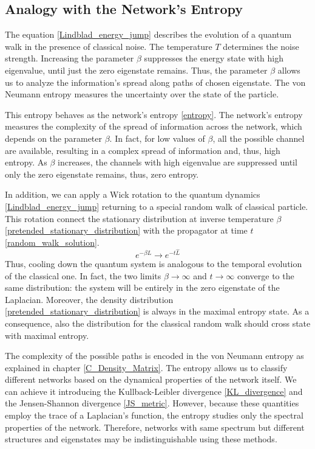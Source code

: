\subsection{Analogy with the Network's Entropy}

The equation \eqref{Lindblad_energy_jump} describes the evolution of a quantum walk in the presence of classical noise. The temperature $T$ determines the noise strength.
Increasing the parameter $\beta$ suppresses the energy state with high eigenvalue, until just the zero eigenstate remains. Thus, the parameter $\beta$ allows us to analyze the information's spread along paths of chosen eigenstate. The von Neumann entropy measures the uncertainty over the state of the particle. 

This entropy behaves as the network's entropy \eqref{entropy}. 
The network's entropy measures the complexity of the spread of information across the network, which depends on the parameter $\beta$. 
In fact, for low values of $\beta$, all the possible channel are available, resulting in a complex spread of information and, thus, high entropy. As $\beta$ increases, the channels with high eigenvalue are suppressed until only the zero eigenstate remains, thus, zero entropy. 

In addition, we can apply a Wick rotation to the quantum dynamics \eqref{Lindblad_energy_jump} returning to a special random walk of classical particle. This rotation connect the stationary distribution at inverse temperature $\beta$ \eqref{pretended_stationary_distribution} with the propagator at time $t$ \eqref{random_walk_solution}.
\begin{equation}
e^{-\beta\hat L} \rightarrow e^{-t\hat L}
\end{equation}
Thus, cooling down the quantum system is analogous to the temporal evolution of the classical one. In fact, the two limits $\beta \rightarrow \infty$ and $t \rightarrow \infty$ converge to the same distribution: the system will be entirely in the zero eigenstate of the Laplacian.
Moreover, the density distribution \eqref{pretended_stationary_distribution} is always in the maximal entropy state. As a consequence, also the distribution for the classical random walk should cross state with maximal entropy.

The complexity of the possible paths is encoded in the von Neumann entropy as explained in chapter \ref{C_Density_Matrix}.
The entropy allows us to classify different networks based on the dynamical properties of the network itself. 
We can achieve it introducing the Kullback-Leibler divergence \eqref{KL_divergence} and the Jensen-Shannon divergence \eqref{JS_metric}.
However, because these quantities employ the trace of a Laplacian's function, the entropy studies only the spectral properties of the network. Therefore, networks with same spectrum but different structures and eigenstates may be indistinguishable using these methods.